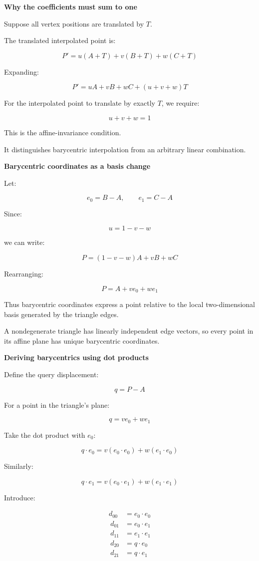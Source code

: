 \textbf{Why the coefficients must sum to one}

Suppose all vertex positions are translated by \(T\).

The translated interpolated point is:

\[
P'=u(A+T)+v(B+T)+w(C+T)
\]

Expanding:

\[
P'=uA+vB+wC+(u+v+w)T
\]

For the interpolated point to translate by exactly \(T\), we require:

\[
u+v+w=1
\]

This is the affine-invariance condition.

It distinguishes barycentric interpolation from an arbitrary linear combination.

\textbf{Barycentric coordinates as a basis change}

Let:

\[
e_0=B-A,\qquad e_1=C-A
\]

Since:

\[
u=1-v-w
\]

we can write:

\[
P=(1-v-w)A+vB+wC
\]

Rearranging:

\[
\boxed{P=A+ve_0+we_1}
\]

Thus barycentric coordinates express a point relative to the local two-dimensional basis generated by the triangle edges.

A nondegenerate triangle has linearly independent edge vectors, so every point in its affine plane has unique barycentric coordinates.

\textbf{Deriving barycentrics using dot products}

Define the query displacement:

\[
q=P-A
\]

For a point in the triangle's plane:

\[
q=ve_0+we_1
\]

Take the dot product with \(e_0\):

\[
q\cdot e_0 = v(e_0\cdot e_0)+w(e_1\cdot e_0)
\]

Similarly:

\[
q\cdot e_1 = v(e_0\cdot e_1)+w(e_1\cdot e_1)
\]

Introduce:

\[
\begin{aligned} d_{00}&=e_0\cdot e_0\\\ d_{01}&=e_0\cdot e_1\\\ d_{11}&=e_1\cdot e_1\\\ d_{20}&=q\cdot e_0\\\ d_{21}&=q\cdot e_1 \end{aligned}
\]

